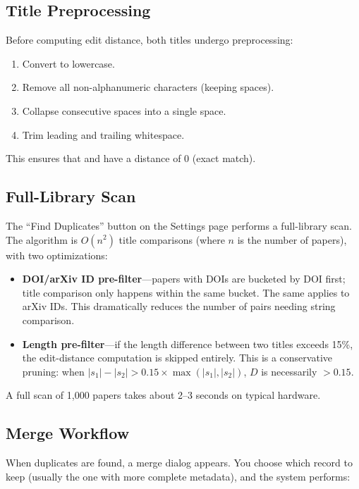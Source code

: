 \subsection{Title Preprocessing}

Before computing edit distance, both titles undergo preprocessing:

\begin{enumerate}
  \item Convert to lowercase.
  \item Remove all non-alphanumeric characters (keeping spaces).
  \item Collapse consecutive spaces into a single space.
  \item Trim leading and trailing whitespace.
\end{enumerate}

This ensures that  and
 have a distance of 0 (exact match).

\subsection{Full-Library Scan}

The ``Find Duplicates'' button on the Settings page performs a full-library scan.
The algorithm is $O(n^2)$ title comparisons (where $n$ is the number of papers),
with two optimizations:

\begin{itemize}
  \item \textbf{DOI/arXiv ID pre-filter}---papers with DOIs are bucketed by DOI first;
    title comparison only happens within the same bucket. The same applies to arXiv
    IDs. This dramatically reduces the number of pairs needing string comparison.
  \item \textbf{Length pre-filter}---if the length difference between two titles exceeds
    15\%, the edit-distance computation is skipped entirely. This is a conservative
    pruning: when $|s_1| - |s_2| > 0.15 \times \max(|s_1|, |s_2|)$, $D$ is
    necessarily $> 0.15$.
\end{itemize}

A full scan of 1,000 papers takes about 2--3 seconds on typical hardware.

\subsection{Merge Workflow}

When duplicates are found, a merge dialog appears. You choose which record to keep
(usually the one with more complete metadata), and the system performs:


